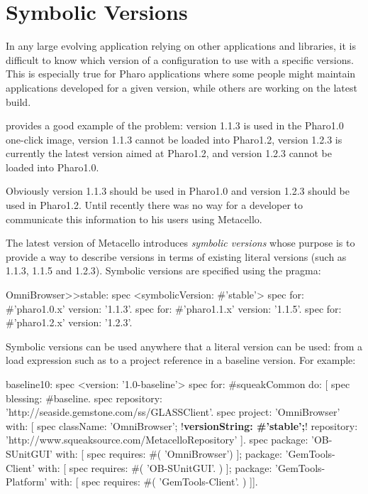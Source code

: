 \documentclass[a4paper,10pt,twoside]{book}
\begin{document}
\section{Symbolic Versions}
In any large evolving application relying on other applications and libraries, it is difficult to know which version of a configuration to use with a specific versions. This is especially true for Pharo applications where some people might maintain applications developed for a given version, while others are working on the latest build.

 provides a good example of the problem: 
version 1.1.3 is used in the Pharo1.0 one-click image,  version 1.1.3 cannot be loaded into Pharo1.2,  version 1.2.3 is currently the latest  version aimed at Pharo1.2, and version 1.2.3 cannot be loaded into Pharo1.0. 

Obviously version 1.1.3 should be used in Pharo1.0 and version 1.2.3 should be used in Pharo1.2. Until recently there was no way for a developer to communicate this information to his users using Metacello.

The latest version of Metacello introduces \emph{symbolic versions} whose purpose is to provide a way to describe versions in terms of existing literal versions (such as 1.1.3, 1.1.5 and 1.2.3). Symbolic versions are specified using the  pragma:

\begin{code}{}
OmniBrowser>>stable: spec
     <symbolicVersion: #'stable'>
     spec for: #'pharo1.0.x' version: '1.1.3'.
     spec for: #'pharo1.1.x' version: '1.1.5'.
     spec for: #'pharo1.2.x' version: '1.2.3'.
\end{code}

Symbolic versions can be used anywhere that a literal version can be used: from a load expression such as 
to a project reference in a baseline version.  For example:

\begin{code}{}
baseline10: spec
  <version: '1.0-baseline'>
  spec for: #squeakCommon do: [
     spec blessing: #baseline.
     spec repository: 'http://seaside.gemstone.com/ss/GLASSClient'.
     spec
        project: 'OmniBrowser' with: [
          spec
             className: 'OmniBrowser';
             !\textbf{versionString: \#'stable';}!
             repository: 'http://www.squeaksource.com/MetacelloRepository' ].
     spec
         package: 'OB-SUnitGUI' with: [
            spec requires: #( 'OmniBrowser') ];
         package: 'GemTools-Client' with: [
            spec requires: #( 'OB-SUnitGUI'. ) ];
         package: 'GemTools-Platform' with: [
            spec requires: #( 'GemTools-Client'. ) ]].
\end{code}
        
\end{document}
